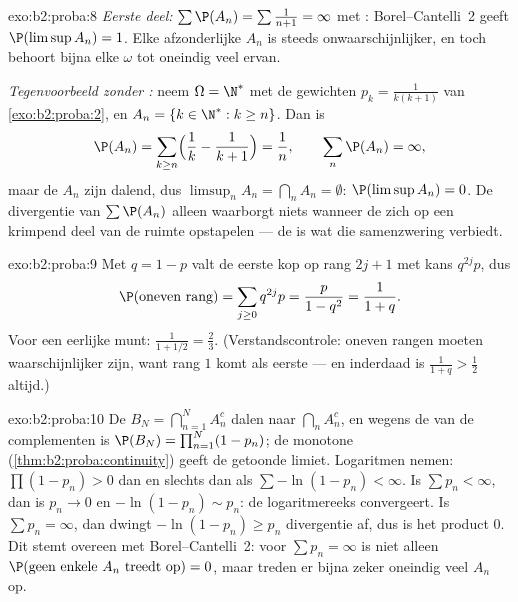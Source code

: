 \begin{solution}{exo:b2:proba:8}
\emph{Eerste deel:} $\sum \P(A_n) = \sum\frac{1}{n+1} = \infty$ met
: Borel--Cantelli~2 geeft $\P(\limsup A_n) = 1$.
Elke afzonderlijke $A_n$ is steeds onwaarschijnlijker, en toch
behoort bijna elke $\omega$ tot oneindig veel ervan.

\emph{Tegenvoorbeeld zonder :} neem $\Omega =
\N^*$ met de gewichten $p_k = \frac{1}{k(k+1)}$ van
\cref{exo:b2:proba:2}, en $A_n = \{k \in \N^* : k \geq n\}$. Dan is
\[
\P(A_n) = \sum_{k \geq n}\Bigl(\frac1k - \frac1{k+1}\Bigr)
= \frac1n ,
\qquad
\sum_n \P(A_n) = \infty ,
\]
maar de $A_n$ zijn dalend, dus $\limsup_n A_n = \bigcap_n A_n =
\emptyset$: $\P(\limsup A_n) = 0$. De divergentie van $\sum\P(A_n)$
alleen waarborgt niets wanneer de  zich op een
krimpend deel van de ruimte opstapelen --- de  is
wat die samenzwering verbiedt.
\end{solution}

\begin{solution}{exo:b2:proba:9}
Met $q = 1 - p$ valt de eerste kop op rang $2j + 1$ met kans
$q^{2j}p$, dus
\[
\P(\text{oneven rang}) = \sum_{j\geq0}q^{2j}p
= \frac{p}{1 - q^2} = \frac{1}{1 + q} .
\]
Voor een eerlijke munt: $\frac1{1 + 1/2} = \frac23$.
(Verstandscontrole: oneven rangen moeten waarschijnlijker zijn,
want rang $1$ komt als eerste --- en inderdaad is
$\frac1{1+q} > \frac12$ altijd.)
\end{solution}

\begin{solution}{exo:b2:proba:10}
De  $B_N = \bigcap_{n=1}^N A_n^c$ dalen naar
$\bigcap_nA_n^c$, en wegens de  van de
complementen is $\P(B_N) = \prod_{n=1}^N(1 - p_n)$; de monotone
 (\cref{thm:b2:proba:continuity}) geeft de getoonde
limiet. Logaritmen nemen: $\prod(1 - p_n) > 0$ dan en slechts dan
als $\sum-\ln(1 - p_n) < \infty$. Is $\sum p_n < \infty$, dan is
$p_n \to 0$ en $-\ln(1 - p_n) \sim p_n$: de logaritmereeks
convergeert. Is $\sum p_n = \infty$, dan dwingt $-\ln(1 - p_n) \geq
p_n$ divergentie af, dus is het product $0$. Dit stemt overeen met
Borel--Cantelli~2: voor $\sum p_n = \infty$ is niet alleen
$\P(\text{geen enkele }A_n\text{ treedt op}) = 0$, maar treden er
bijna zeker oneindig veel $A_n$ op.
\end{solution}

